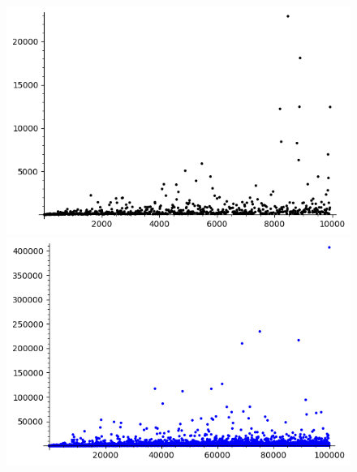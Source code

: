 \documentclass[12pt]{report}
\begin{document}
\begin{figure}[h]
\centering
\begin{minipage}{.5\textwidth}
  \centering
  \includegraphics[width=.9\linewidth]{MCount1.png}
\end{minipage}%
\begin{minipage}{.5\textwidth}
  \centering
  \includegraphics[width=.9\linewidth]{MCount.png}
\end{minipage}
\end{figure}
\end{document}
